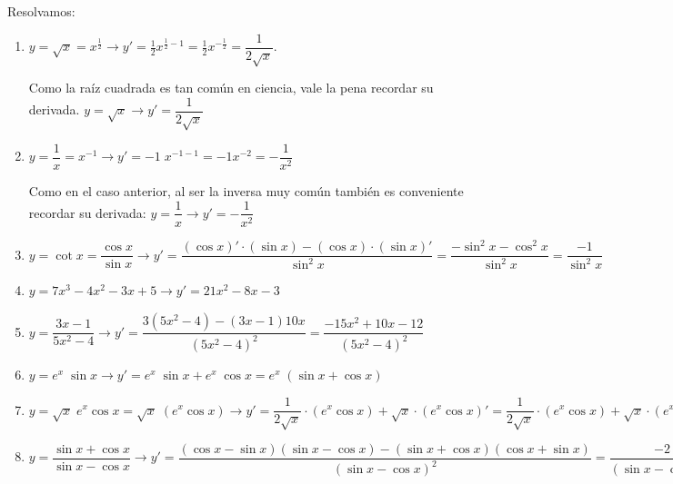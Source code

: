 	
	
	\begin{proofw}\renewcommand{\qedsymbol}{$\diamond$}
	
	Resolvamos:
		
		\begin{enumerate}
			\item $y=\sqrt{x}=x^{\frac 1 2} \to y'=\frac 1 2 x^{\frac 1 2 - 1}= \frac 1 2 x^{-\frac 1 2}= \dfrac {1}{2 \sqrt {x}}$. 
			
			Como la raíz cuadrada es tan común en ciencia, vale la pena recordar su derivada. $y=\sqrt{x} \to y'=\dfrac {1}{2 \sqrt {x}}$
			\item $y=\dfrac 1 x = x^{-1}\to y'=-1\; x^{-1-1}=-1 x^{-2}=-\dfrac 1 {x^2}$
			
			Como en el caso anterior, al ser la inversa muy común también es conveniente recordar su derivada: $y=\dfrac 1 x \to y'=-\dfrac 1 {x^2}$
			
			\item $y=\cot x=\dfrac {\cos x}{\sin x} \to y'=\dfrac {(\cos x)'\cdot (\sin x) - (\cos x)\cdot (\sin x)' }{\sin^2 x}=\dfrac {-\sin^2 x - \cos^2 x}{\sin^2 x}= \dfrac {-1}{\sin^2 x}$
			
			\item $y=7x^3-4x^2-3x+5 \to y'=21x^2-8x-3$
			
			\item $y=\dfrac {3x-1}{5x^2-4} \to y'=\dfrac {3(5x^2-4)-(3x-1)10x}{(5x^2-4)^2}=\dfrac {-15x^2+10x-12}{(5x^2-4)^2}$
			
			\item $y=e^x \; \sin x \to y'= e^x \; \sin x +e^x \; \cos x=e^x\; (\sin x + \cos x) $
			
			\item $y=\sqrt{x} \; e^x \cos x = \sqrt{x} \; (e^x \cos x) \to y'= \dfrac {1}{2 \sqrt{x}}\cdot (e^x \cos x) + \sqrt{x} \cdot (e^x \cos x)' = \dfrac {1}{2 \sqrt{x}}\cdot (e^x \cos x) + \sqrt{x} \cdot (e^x \cos x + e^x (-\sin x)) = \dfrac {1}{2 \sqrt{x}}\cdot (e^x \cos x) + \sqrt{x} \cdot (e^x \cos x - e^x \sin x)$
			
			\item $y=\dfrac {\sin x + \cos x}{\sin x - \cos x} \to y'=\dfrac {(\cos x - \sin x)(\sin x - \cos x)-(\sin x + \cos x)(\cos x + \sin x)}{(\sin x - \cos x)^2}=\dfrac {-2}{(\sin x - \cos x)^2}$
			
		\end{enumerate}
		
	\end{proofw}

